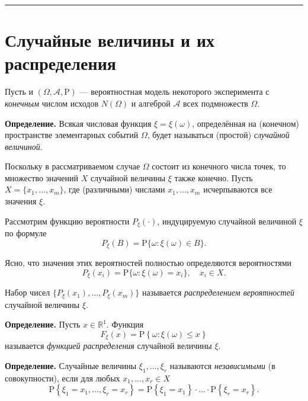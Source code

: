 \documentclass[11pt,a4paper]{article}
\renewcommand{\linethickness}{0.1ex}
\begin{document}
    \begin{center}\rule{0.5\linewidth}{\linethickness}\end{center}

    \hypertarget{ux441ux43bux443ux447ux430ux439ux43dux44bux435-ux432ux435ux43bux438ux447ux438ux43dux44b-ux438-ux438ux445-ux440ux430ux441ux43fux440ux435ux434ux435ux43bux435ux43dux438ux44f}{%
\section{Случайные величины и их
распределения}\label{ux441ux43bux443ux447ux430ux439ux43dux44bux435-ux432ux435ux43bux438ux447ux438ux43dux44b-ux438-ux438ux445-ux440ux430ux441ux43fux440ux435ux434ux435ux43bux435ux43dux438ux44f}}

Пусть и \((\Omega, \mathcal{A}, \mathrm{P})\) --- вероятностная модель
некоторого эксперимента с \emph{конечным} числом исходов \(N(\Omega)\) и
алгеброй \(\mathcal{A}\) всех подмножеств \(\Omega\).

\textbf{Определение.} Всякая числовая функция \(\xi = \xi(\omega)\),
определённая на (конечном) пространстве элементарных событий \(\Omega\),
будет называться (простой) \emph{случайной величиной}.

Поскольку в рассматриваемом случае \(\Omega\) состоит из конечного числа
точек, то множество значений \(X\) случайной величины \(\xi\) также
конечно. Пусть \(X = \{x_1, \ldots, x_m\}\), где (различными) числами
\(x_1, \ldots, x_m\) исчерпываются все значения \(\xi\).

Рассмотрим функцию вероятности \(P_\xi(\cdot)\), индуцируемую случайной
величиной \(\xi\) по формуле
\[ P_\xi(B) = \mathrm{P}\{\omega: \xi(\omega) \in B\}. \]

Ясно, что значения этих вероятностей полностью определяются
вероятностями
\[ P_\xi(x_i) = \mathrm{P}\{\omega: \xi(\omega) = x_i\}, \quad x_i \in X. \]

Набор чисел \(\{ P_\xi(x_1), \ldots , P_\xi(x_m) \}\) называется
\emph{распределением вероятностей} случайной величины \(\xi\).

\textbf{Определение.} Пусть \(x \in \mathbb{R}^1\). Функция
\[ F_\xi(x)  = \mathrm{P} \left\{ \omega: \xi(\omega) \le x \right\} \]
называется \emph{функцией распределения} случайной величины \(\xi\).

\textbf{Определение.} Случайные величины \(\xi_1, \ldots, \xi_r\)
называются \emph{независимыми} (в совокупности), если для любых
\(x_1, \ldots, x_r \in X\) \[
    \mathrm{P}\left\{ \xi_1=x_1, \ldots, \xi_r=x_r \right\} =
    \mathrm{P}\left\{ \xi_1=x_1\right\} \cdot \ldots \cdot \mathrm{P}\left\{\xi_r=x_r \right\}.
\]
\end{document}
